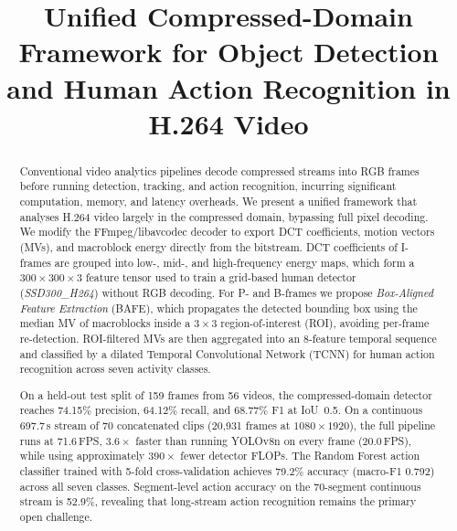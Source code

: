 \documentclass[conference]{IEEEtran}
\begin{document}
\title{Unified Compressed-Domain Framework for Object Detection\\
and Human Action Recognition in H.264 Video}

\author{
\and
{}
\and
{}
\and
{}
\and
{}
}

\maketitle

\begin{abstract}
Conventional video analytics pipelines decode compressed streams into RGB frames before running detection, tracking, and action recognition, incurring significant computation, memory, and latency overheads. We present a unified framework that analyses H.264 video largely in the compressed domain, bypassing full pixel decoding. We modify the FFmpeg/libavcodec decoder to export DCT coefficients, motion vectors (MVs), and macroblock energy directly from the bitstream. DCT coefficients of I-frames are grouped into low-, mid-, and high-frequency energy maps, which form a $300\!\times\!300\!\times\!3$ feature tensor used to train a grid-based human detector (\emph{SSD300\_H264}) without RGB decoding. For P- and B-frames we propose \emph{Box-Aligned Feature Extraction} (BAFE), which propagates the detected bounding box using the median MV of macroblocks inside a $3\!\times\!3$ region-of-interest (ROI), avoiding per-frame re-detection. ROI-filtered MVs are then aggregated into an 8-feature temporal sequence and classified by a dilated Temporal Convolutional Network (TCNN) for human action recognition across seven activity classes.

On a held-out test split of 159 frames from 56 videos, the compressed-domain detector reaches 74.15\% precision, 64.12\% recall, and 68.77\% F1 at IoU~0.5. On a continuous 697.7\,s stream of 70 concatenated clips (20{,}931 frames at $1080\!\times\!1920$), the full pipeline runs at 71.6\,FPS, $3.6\!\times$ faster than running YOLOv8n on every frame (20.0\,FPS), while using approximately $390\!\times$ fewer detector FLOPs. The Random Forest action classifier trained with 5-fold cross-validation achieves 79.2\% accuracy (macro-F1 0.792) across all seven classes. Segment-level action accuracy on the 70-segment continuous stream is 52.9\%, revealing that long-stream action recognition remains the primary open challenge.
\end{abstract}
\end{document}
